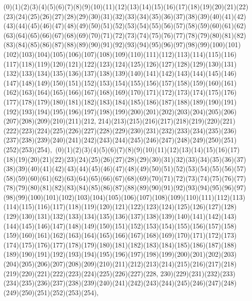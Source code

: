 \documentclass[12pt]{article}
\begin{document}
{(0)(1)(2)(3)(4)(5)(6)(7)(8)(9)(10)(11)(12)(13)(14)(15)(16)(17)(18)(19)(20)(21)(22)(23)(24)(25)(26)(27)(28)(29)(30)(31)(32)(33)(34)(35)(36)(37)(38)(39)(40)(41)(42)(43)(44)(45)(46)(47)(48)(49)(50)(51)(52)(53)(54)(55)(56)(57)(58)(59)(60)(61)(62)(63)(64)(65)(66)(67)(68)(69)(70)(71)(72)(73)(74)(75)(76)(77)(78)(79)(80)(81)(82)(83)(84)(85)(86)(87)(88)(89)(90)(91)(92)(93)(94)(95)(96)(97)(98)(99)(100)(101)(102)(103)(104)(105)(106)(107)(108)(109)(110)(111)(112)(113)(114)(115)(116)(117)(118)(119)(120)(121)(122)(123)(124)(125)(126)(127)(128)(129)(130)(131)(132)(133)(134)(135)(136)(137)(138)(139)(140)(141)(142)(143)(144)(145)(146)(147)(148)(149)(150)(151)(152)(153)(154)(155)(156)(157)(158)(159)(160)(161)(162)(163)(164)(165)(166)(167)(168)(169)(170)(171)(172)(173)(174)(175)(176)(177)(178)(179)(180)(181)(182)(183)(184)(185)(186)(187)(188)(189)(190)(191)(192)(193)(194)(195)(196)(197)(198)(199)(200)(201)(202)(203)(204)(205)(206)(207)(208)(209)(210)(211)(212, 214)(213)(215)(216)(217)(218)(219)(220)(221)(222)(223)(224)(225)(226)(227)(228)(229)(230)(231)(232)(233)(234)(235)(236)(237)(238)(239)(240)(241)(242)(243)(244)(245)(246)(247)(248)(249)(250)(251)(252)(253)(254)$
, 
$
(0)(1)(2)(3)(4)(5)(6)(7)(8)(9)(10)(11)(12)(13)(14)(15)(16)(17)(18)(19)(20)(21)(22)(23)(24)(25)(26)(27)(28)(29)(30)(31)(32)(33)(34)(35)(36)(37)(38)(39)(40)(41)(42)(43)(44)(45)(46)(47)(48)(49)(50)(51)(52)(53)(54)(55)(56)(57)(58)(59)(60)(61)(62)(63)(64)(65)(66)(67)(68)(69)(70)(71)(72)(73)(74)(75)(76)(77)(78)(79)(80)(81)(82)(83)(84)(85)(86)(87)(88)(89)(90)(91)(92)(93)(94)(95)(96)(97)(98)(99)(100)(101)(102)(103)(104)(105)(106)(107)(108)(109)(110)(111)(112)(113)(114)(115)(116)(117)(118)(119)(120)(121)(122)(123)(124)(125)(126)(127)(128)(129)(130)(131)(132)(133)(134)(135)(136)(137)(138)(139)(140)(141)(142)(143)(144)(145)(146)(147)(148)(149)(150)(151)(152)(153)(154)(155)(156)(157)(158)(159)(160)(161)(162)(163)(164)(165)(166)(167)(168)(169)(170)(171)(172)(173)(174)(175)(176)(177)(178)(179)(180)(181)(182)(183)(184)(185)(186)(187)(188)(189)(190)(191)(192)(193)(194)(195)(196)(197)(198)(199)(200)(201)(202)(203)(204)(205)(206)(207)(208)(209)(210)(211)(212)(213)(214)(215)(216)(217)(218)(219)(220)(221)(222)(223)(224)(225)(226)(227)(228, 230)(229)(231)(232)(233)(234)(235)(236)(237)(238)(239)(240)(241)(242)(243)(244)(245)(246)(247)(248)(249)(250)(251)(252)(253)(254)$
, 
$
}
\end{document}
